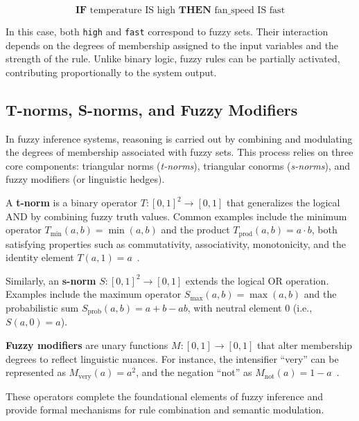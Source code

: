\begin{equation}
\textbf{IF } \text{temperature IS high} \textbf{ THEN } \text{fan\_speed IS fast}
\label{eq:ejemplo_fuzzy-rule}
\end{equation}

In this case, both \texttt{high} and \texttt{fast} correspond to fuzzy sets. Their interaction depends on the degrees of membership assigned to the input variables and the strength of the rule. Unlike binary logic, fuzzy rules can be partially activated, contributing proportionally to the system output.

\subsection{T-norms, S-norms, and Fuzzy Modifiers}

In fuzzy inference systems, reasoning is carried out by combining and modulating the degrees of membership associated with fuzzy sets. This process relies on three core components: triangular norms (\textit{t-norms}), triangular conorms (\textit{s-norms}), and fuzzy modifiers (or linguistic hedges).

A \textbf{t-norm} is a binary operator $T: [0,1]^2 \rightarrow [0,1]$ that generalizes the logical AND by combining fuzzy truth values. Common examples include the minimum operator $T_{\min}(a,b) = \min(a,b)$ and the product $T_{\text{prod}}(a,b) = a \cdot b$, both satisfying properties such as commutativity, associativity, monotonicity, and the identity element $T(a,1)=a$~\parencite{klement2013triangular}.

Similarly, an \textbf{s-norm} $S: [0,1]^2 \rightarrow [0,1]$ extends the logical OR operation. Examples include the maximum operator $S_{\max}(a,b) = \max(a,b)$ and the probabilistic sum $S_{\text{prob}}(a,b) = a + b - ab$, with neutral element $0$ (i.e., $S(a,0) = a$).

\textbf{Fuzzy modifiers} are unary functions $M: [0,1] \rightarrow [0,1]$ that alter membership degrees to reflect linguistic nuances. For instance, the intensifier “very” can be represented as $M_{\text{very}}(a) = a^2$, and the negation “not” as $M_{\text{not}}(a) = 1 - a$~\parencite{dombi2021modifiers}.

These operators complete the foundational elements of fuzzy inference and provide formal mechanisms for rule combination and semantic modulation.








